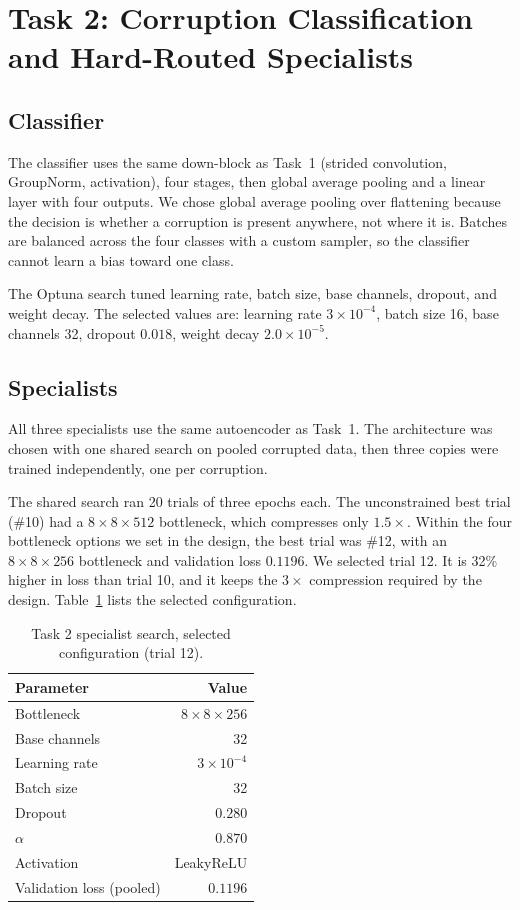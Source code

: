 \documentclass[conference]{IEEEtran}
\begin{document}
\section{Task 2: Corruption Classification and Hard-Routed Specialists}
\subsection{Classifier}
The classifier uses the same down-block as Task~1 (strided convolution, GroupNorm, activation), four
stages, then global average pooling and a linear layer with four outputs. We chose global average
pooling over flattening because the decision is whether a corruption is present anywhere, not where
it is. Batches are balanced across the four classes with a custom sampler, so the classifier cannot
learn a bias toward one class.

The Optuna search tuned learning rate, batch size, base channels, dropout, and weight decay. The
selected values are: learning rate $3\times10^{-4}$, batch size 16, base channels 32, dropout
$0.018$, weight decay $2.0\times10^{-5}$.

\subsection{Specialists}
All three specialists use the same autoencoder as Task~1. The architecture was chosen with one shared
search on pooled corrupted data, then three copies were trained independently, one per corruption.

The shared search ran 20 trials of three epochs each. The unconstrained best trial (\#10) had a
$8\times8\times512$ bottleneck, which compresses only $1.5\times$. Within the four bottleneck options we
set in the design, the best trial was \#12, with an $8\times8\times256$ bottleneck and validation loss
$0.1196$. We selected trial 12. It is 32\% higher in loss than trial 10, and it keeps the
$3\times$ compression required by the design. Table~\ref{tab:t2spec} lists the selected configuration.

\begin{table}[t]
\centering
\caption{Task 2 specialist search, selected configuration (trial 12).}
\label{tab:t2spec}
\begin{tabular}{@{}lr@{}}
\toprule
Parameter & Value \\
\midrule
Bottleneck & $8\times8\times256$ \\
Base channels & 32 \\
Learning rate & $3\times10^{-4}$ \\
Batch size & 32 \\
Dropout & $0.280$ \\
$\alpha$ & $0.870$ \\
Activation & LeakyReLU \\
Validation loss (pooled) & $0.1196$ \\
\bottomrule
\end{tabular}
\end{table}
\end{document}
